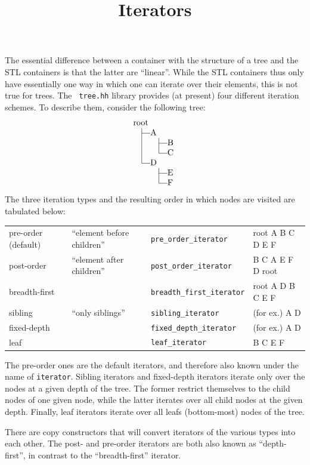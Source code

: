 \documentclass[11pt]{kasper}
\newcommand{\member}[1]{{\tt #1}\index{#1}}
\def\mystrut{\vbox to 8.5pt{}\vtop to 3.5pt{}}
\def\V{\hskip10pt\vrule\hskip10pt}
\def\T{\hskip10pt\vrule\vrule height2.5pt depth -2.1pt width 10pt}
\def\L{\hskip10pt\vrule height 8.5pt depth -2.1pt
       \vrule height2.5pt depth -2.1pt width 10pt}
\def\N{\hskip10pt\phantom{\vrule}\hskip10pt}
\def\hw{\hskip-1000pt plus 1fil}
\begin{document}
\begin{sectionunit}
\begin{sectionunit}
\end{sectionunit}
\begin{sectionunit}
\title{Iterators}
\maketitle

The essential difference between a container with the structure of a
tree and the STL containers is that the latter are ``linear''. While
the STL containers thus only have essentially one way in which one can
iterate over their elements, this is not true for trees. The {\tt
tree.hh} library provides (at present) four different iteration
schemes. To describe them, consider the following tree:
\begin{equation*}
\vcenter{\offinterlineskip
\halign{&#\mystrut\hfil\cr
 root \hw\cr
 \T A \cr
 \V   \T  B \cr
 \V   \L  C \cr
 \L D \cr
 \N   \T  E \cr
 \N   \L  F \cr}}
\end{equation*}
The three iteration types and the resulting order in which nodes are
visited are tabulated below:
\begin{center}
\begin{tabular}{llll}
pre-order (default) & ``element before children'' &
\member{pre\_order\_iterator}  & root A B C D E F \\
post-order          & ``element after children''  &
\member{post\_order\_iterator} & B C A E F D root \\
breadth-first &  &
\member{breadth\_first\_iterator} & root A D B C E F  \\
sibling             & ``only siblings'' & 
\member{sibling\_iterator} & (for ex.) A D \\
fixed-depth         & &
\member{fixed\_depth\_iterator} & (for ex.) A D \\
leaf                & &
\member{leaf\_iterator} & B C E F
\end{tabular}
\end{center}
The pre-order ones are the default iterators, and therefore also known
under the name of {\tt iterator}. Sibling iterators and fixed-depth
iterators iterate only over the nodes at a given depth of the
tree. The former restrict themselves to the child nodes of one given
node, while the latter iterates over all child nodes at the given
depth. Finally, leaf iterators iterate over all leafs (bottom-most)
nodes of the tree.

There are copy constructors that will convert iterators of the
various types into each other. The post- and pre-order iterators are
both also known as ``depth-first'', in contrast to the
``breadth-first'' iterator.


\end{sectionunit}
\end{sectionunit}
\end{document}
